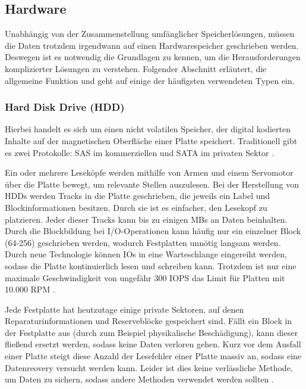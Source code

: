 \subsection{Hardware}

Unabhängig von der Zusammenstellung umfänglicher Speicherlösungen, müssen die Daten trotzdem irgendwann auf einen Hardwarespeicher geschrieben werden. Deswegen ist es notwendig die Grundlagen zu kennen, um die Herausforderungen komplizierter Lösungen zu verstehen. Folgender Abschnitt erläutert, die allgemeine Funktion und geht auf einige der häufigsten verwendeten Typen ein.

\subsubsection{Hard Disk Drive (HDD)}

Hierbei handelt es sich um einen nicht volatilen Speicher, der digital kodierten Inhalte auf der magnetischen Oberfläche einer Platte speichert. Traditionell gibt es zwei Protokolle: SAS im kommerziellen und SATA im privaten Sektor \parencite{wikibooks.2016}.

Ein oder mehrere Leseköpfe werden mithilfe von Armen und einem Servomotor über die Platte bewegt, um relevante Stellen auszulesen. Bei der Herstellung von HDDs werden Tracks in die Platte geschrieben, die jeweils ein Label und Blockinformationen besitzen. Durch sie ist es einfacher, den Lesekopf zu platzieren. Jeder dieser Tracks kann bis zu einigen MBs an Daten beinhalten. Durch die Blockbildung bei I/O-Operationen kann häufig nur ein einzelner Block (64-256) geschrieben werden, wodurch Festplatten unnötig langsam werden. Durch neue Technologie können IOs in eine Warteschlange eingereiht werden, sodass die Platte kontinuierlich lesen und schreiben kann. Trotzdem ist nur eine maximale Geschwindigkeit von ungefähr 300 \gls{IOPS} das Limit für Platten mit 10.000 RPM \parencite[Kap. 3]{kaufmann.2016}.

Jede Festplatte hat heutzutage einige private Sektoren, auf denen Reparaturinformationen und Reserveblöcke gespeichert sind. Fällt ein Block in der Festplatte aus (durch zum Beispiel physikalische Beschädigung), kann dieser fließend ersetzt werden, sodass keine Daten verloren gehen. Kurz vor dem Ausfall einer Platte steigt diese Anzahl der Lesefehler einer Platte massiv an, sodass eine Datenreovery versucht werden kann. Leider ist dies keine verlässliche Methode, um Daten zu sichern, sodass andere Methoden verwendet werden sollten \parencite[Kap. 3]{kaufmann.2016}.

